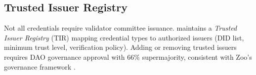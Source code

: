 \subsection{Trusted Issuer Registry}

Not all credentials require validator committee issuance. \IChain{} maintains a \emph{Trusted Issuer Registry} (TIR) mapping credential types to authorized issuers (DID list, minimum trust level, verification policy). Adding or removing trusted issuers requires DAO governance approval with 66\% supermajority, consistent with Zoo's governance framework \cite{zoo-dao-governance}.

